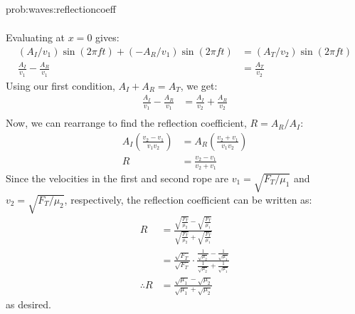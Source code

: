 \begin{solution}{prob:waves:reflectioncoeff}
\begin{enumerate}[(a)]
\begin{align*}
\end{align*}
Evaluating at $x=0$ gives:
\begin{align*}
(A_I/v_1) \sin (2\pi ft) +(-A_R/v_1) \sin (2\pi ft)&=(A_T/v_2) \sin (2\pi ft)\\
\frac{A_I}{v_1} -\frac{A_R}{v_1}&=\frac{A_T}{v_2} 
\end{align*}
Using our first condition, $A_I+A_R=A_T$, we get:
\begin{align*}
\frac{A_I}{v_1} -\frac{A_R}{v_1}&=\frac{A_I}{v_2}+\frac{A_R}{v_2}\\
\end{align*}
Now, we can rearrange to find the reflection coefficient, $R=A_R/A_I$:
\begin{align*}
A_I\left( \frac{v_2-v_1}{v_1v_2}\right)&=A_R\left( \frac{v_2+v_1}{v_1v_2}\right)\\
R&=\frac{v_2-v_1}{v_2+v_1}
\end{align*}
Since the velocities in the first and second rope are $v_1=\sqrt{F_T/\mu_1}$ and $v_2=\sqrt{F_T/\mu_2}$, respectively, the reflection coefficient can be written as:
\begin{align*}
R&=\frac{\sqrt{\frac{F_T}{\mu_2}}-\sqrt{\frac{F_T}{\mu_1}}}{\sqrt{\frac{F_T}{\mu_2}}+\sqrt{\frac{F_T}{\mu_1}}}\\
&=\frac{\sqrt{F_T}}{\sqrt{F_T}}\cdot \frac{\frac{1}{\sqrt{\mu_2}}-\frac{1}{\sqrt{\mu_1}}}{\frac{1}{\sqrt{\mu_2}}+\frac{1}{\sqrt{\mu_1}}}\\
\therefore R&=\frac{\sqrt{\mu_1}-\sqrt{\mu_2}}{\sqrt{\mu_1}+\sqrt{\mu_2}}
\end{align*}
as desired. 
\end{enumerate}
\end{solution}



